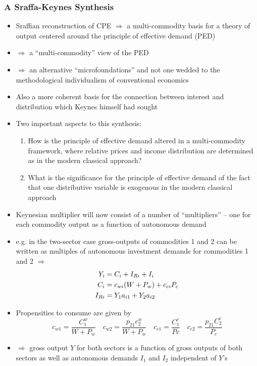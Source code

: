 \documentclass{article}
\begin{document}
\subsubsection{A Sraffa-Keynes Synthesis}
	\begin{itemize}
		\item Sraffian reconstruction of CPE \( \Rightarrow \) a multi-commodity basis for a theory of output centered around the principle of effective demand (PED)
		\item \( \Rightarrow \) a ``multi-commodity'' view of the PED
		\item \( \Rightarrow \) an alternative ``microfoundations'' and not one wedded to the methodological individualism of conventional economics
		\item Also a more coherent basis for the connection between interest and distribution which Keynes himself had sought
		\item Two important aspects to this synthesis:
		\begin{enumerate}[label=\textbf{\arabic*.}]
			\item How is the principle of effective demand altered in a multi-commodity framework, where relative prices and income distribution are determined as in the modern classical approach?
			\item What is the significance for the principle of effective demand of the fact that one distributive variable is exogenous in the modern classical approach
		\end{enumerate}
		\item Keynesian multiplier will now consist of a number of ``multipliers'' -- one for each commodity output as a function of autonomous demand
		\item e.g. in the two-sector case gross-outputs of commodities 1 and 2 can be written as multiples of autonomous investment demands for commodities 1 and 2 \( \Rightarrow \)
		\begin{align}
			Y_i &= C_i+I_{Ri}+I_i \notag\\
			C_i &= c_{wi}(W+P_w)+c_{ci}P_c\\
			I_{Ri} &= Y_1a_{i1}+Y_2a_{i2} \notag
		\end{align}
		\item Propensities to consume are given by
		\[
			c_{w1} = \frac{C_1^w}{W+P_w} \quad c_{w2}=\frac{p_{21}c_2^w}{W+P_w} \quad c_{c1}=\frac{C_1^c}{Pc} \quad c_{c2}=\frac{p_{21}C_2^c}{P_c}
		\]
		\item \( \Rightarrow \) gross output \( Y \) for both sectors is a function of gross outputs of both sectors as well as autonomous demands \( I_1 \) and \( I_2 \) independent of \( Y \)'s

\end{itemize}
\end{document}
